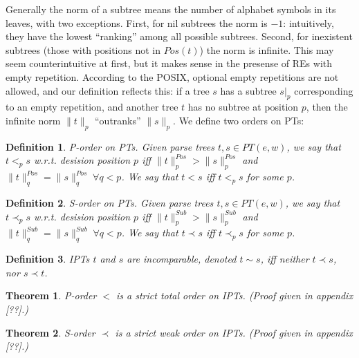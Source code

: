 \documentclass[AMA,STIX1COL]{WileyNJD-v2}
\newcommand{\pnorm}[2]{\|{#1}\|^{Pos}_{#2}}
\newcommand{\snorm}[2]{\|{#1}\|^{Sub}_{#2}}
\newtheorem{Xdef}{Definition}
\newtheorem{XThe}{Theorem}
\begin{document}
Generally the norm of a subtree means the number of alphabet symbols in its leaves, with two exceptions.
First, for nil subtrees the norm is $-1$: intuitively, they have the lowest ``ranking'' among all possible subtrees.
Second, for inexistent subtrees (those with positions not in $Pos(t)$) the norm is infinite.
This may seem counterintuitive at first, but it makes sense in the presense of REs with empty repetition.
According to the POSIX, optional empty repetitions are not allowed, and our definition reflects this:
if a tree $s$ has a subtree $s|_p$ corresponding to an empty repetition,
and another tree $t$ has no subtree at position $p$,
then the infinite norm $\|t\|_p$ ``outranks'' $\|s\|_p$.
We define two orders on PTs:

    \begin{Xdef}\label{total_order_on_PTs}
    \emph{P-order on PTs.}
    Given parse trees $t, s \in PT(e, w)$, we say that $t <_p s$ w.r.t. \emph{desision position} $p$
    iff $\pnorm{t}{p} > \pnorm{s}{p}$ and $\pnorm{t}{q} = \pnorm{s}{q} \; \forall q < p$.
    We say that $t < s$ iff $t <_p s$ for some $p$.
    \end{Xdef}

    \begin{Xdef}\label{partial_order_on_PTs}
    \emph{S-order on PTs.}
    Given parse trees $t, s \in PT(e, w)$, we say that $t \prec_p s$ w.r.t. \emph{desision position} $p$ %
    iff $\snorm{t}{p} > \snorm{s}{p}$ and $\snorm{t}{q} = \snorm{s}{q} \; \forall q < p$.
    We say that $t \prec s$ iff $t \prec_p s$ for some $p$.
    \end{Xdef}

    \begin{Xdef}\label{incomparable_IPTs}
    IPTs $t$ and $s$ are \emph{incomparable}, denoted $t \sim s$,
    iff neither $t \prec s$, nor $s \prec t$.
    \end{Xdef}

    \begin{XThe}\label{theorem_porder_on_PTs}
    P-order $<$ is a strict total order on IPTs.
    (Proof given in appendix [??].)
    \end{XThe}

    \begin{XThe}\label{theorem_sorder_on_PTs}
    S-order $\prec$ is a strict weak order on IPTs.
    (Proof given in appendix [??].)
    \end{XThe}
\end{document}
